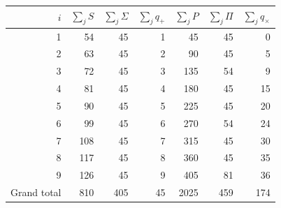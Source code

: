 \begin{tablacompleta}[htbp]
\caption{Cumulative row evaluations of the APP support.}
\label{tab:app-totales_filas}
\begin{tabular}{r*{6}{r}}
\toprule
$i$ & $\sum_j S$ & $\sum_j\Sigma$ & $\sum_j q_+$ & $\sum_j P$ & $\sum_j\Pi$ & $\sum_j q_\times$ \\
\midrule
1 & 54 & 45 & 1 & 45 & 45 & 0 \\
2 & 63 & 45 & 2 & 90 & 45 & 5 \\
3 & 72 & 45 & 3 & 135 & 54 & 9 \\
4 & 81 & 45 & 4 & 180 & 45 & 15 \\
5 & 90 & 45 & 5 & 225 & 45 & 20 \\
6 & 99 & 45 & 6 & 270 & 54 & 24 \\
7 & 108 & 45 & 7 & 315 & 45 & 30 \\
8 & 117 & 45 & 8 & 360 & 45 & 35 \\
9 & 126 & 45 & 9 & 405 & 81 & 36 \\
\midrule
Grand total & 810 & 405 & 45 & 2025 & 459 & 174 \\
\bottomrule
\end{tabular}
\end{tablacompleta}
